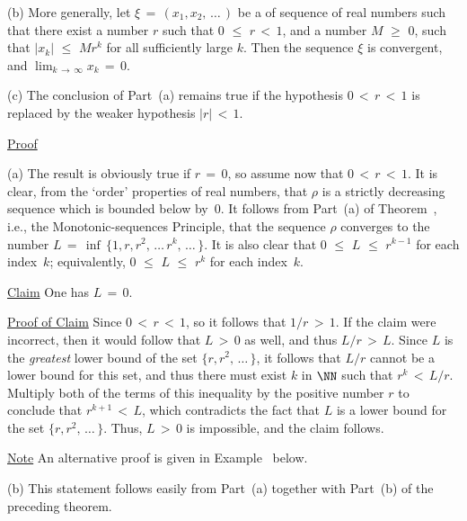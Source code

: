 \V

        (b) More generally,  let ${\xi} \,=\, (x_{1},x_{2},\,{\ldots}\,)$ be a of sequence of real numbers such that there exist a number $r$ such that $0\,\,{\leq}\,\,r\,<\,1$, 
    and a number $M\,\,{\geq}\,\,0$, such that $|x_{k}|\,\,{\leq}\,\,M r^{k}$ for all sufficiently large $k$.
    Then the sequence ${\xi}$ is convergent, and $\lim_{k \,{\rightarrow}\, {\infty}} x_{k} \,=\, 0$.

\V

        (c) The conclusion of Part~(a) remains true if the hypothesis $0\,<\,r\,<\,1$ is replaced by the weaker hypothesis $|r|\,<\,1$.

        \underline{Proof}

\V

        (a) The result is obviously true if $r \,=\, 0$, so assume now that $0\,<\,r\,<\,1$. It is clear, from the `order' properties of real numbers,
    that ${\rho}$ is a strictly decreasing sequence which is bounded below by~$0$. It follows from Part~(a) of Theorem~,
    i.e., the Monotonic-sequences Principle, that the sequence ${\rho}$ converges to the number $L \,=\, {\inf}\,\{1, r, r^{2}, \,{\ldots}\,r^{k}, \,{\ldots}\,\}$.
    It is also clear that $0\,\,{\leq}\,\,L\,\,{\leq}\,\,r^{k-1}$ for each index~$k$; equivalently, $0\,\,{\leq}\,\,L\,\,{\leq}\,\,r^{k}$ for each index~$k$.

        \underline{Claim} One has $L \,=\, 0$.

        \underline{Proof of Claim} Since $0\,<\,r\,<\,1$, so it follows that $1/r\,>\,1$.
    If the claim were incorrect, then it would follow that $L\,>\,0$ as well, and thus $L/r\,>\,L$.
    Since $L$ is the {\em greatest} lower bound of the set $\{r,r^{2},\,{\ldots}\,\}$,
    it follows that $L/r$ cannot be a lower bound for this set, and thus there must exist $k$ in ${\NN}$ such that $r^{k}\,<\,L/r$.
    Multiply both of the terms of this inequality by the positive number $r$ to conclude that $r^{k+1}\,<\,L$,
    which contradicts the fact that $L$ is a lower bound for the set $\{r,r^{2},\,{\ldots}\,\}$. Thus, $L\,>\,0$ is impossible, and the claim follows.


        \underline{Note} An alternative proof is given in Example~ below.

\V

        (b) This statement follows easily from Part~(a) together with Part~(b) of the preceding theorem.

\V

